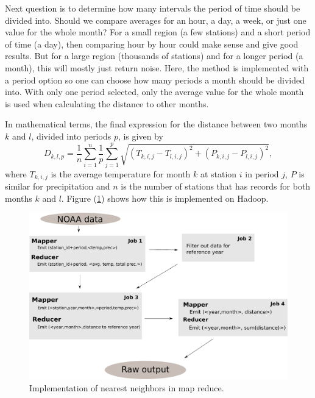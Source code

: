 Next question is to determine how many intervals the period of time should be
divided into. Should we compare averages for an hour, a day, a week, or just one
value for the whole month? For a small region (a few stations) and a short
period of time (a day), then comparing hour by hour could make sense and give
good results. But for a large region (thousands of stations) and for a longer
period (a month), this will mostly just return noise. Here, the method is
implemented with a period option so one can choose how many periods a month
should be divided into. With only one period selected, only the average value
for the whole month is used when calculating the distance to other months.

In mathematical terms, the final expression for the distance between two months
$k$ and $l$, divided into periods $p$, is given by
\begin{equation}
	\label{eq:NN}
	D_{k,l,p} = \frac{1}{n}\sum_{i=1}^{n}{\frac{1}{p}\sum_{j=1}^{p}{
		\sqrt{
			(T_{k,i,j} - T_{l,i,j})^2 + 
			(P_{k,i,j} - P_{l,i,j})^2
		}}},
\end{equation}
where $T_{k,i,j}$ is the average temperature for month $k$ at station $i$ in 
period $j$, $P$ is similar for precipitation and $n$ is the number of stations
that has records for both months $k$ and $l$. Figure (\ref{fig:NNmapReduce}) shows
how this is implemented on Hadoop.

\begin{figure}[tb]
 	\begin{center}
 		\includegraphics[width=12cm]{figures/NNmapReduce.pdf}
 	\end{center}
 	\caption{Implementation of nearest neighbors in map reduce.}
 	\label{fig:NNmapReduce}
 \end{figure} 

